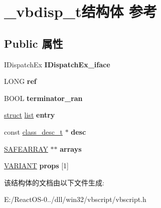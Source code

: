 \hypertarget{struct__vbdisp__t}{}\section{\+\_\+vbdisp\+\_\+t结构体 参考}
\label{struct__vbdisp__t}
\subsection*{Public 属性}
\begin{DoxyCompactItemize}
\item 
\mbox{\label{struct__vbdisp__t_a7200f265b6a5faaa17b4cf261f916a2f}} 
I\+Dispatch\+Ex {\bfseries I\+Dispatch\+Ex\+\_\+iface}
\item 
\mbox{\label{struct__vbdisp__t_ab9bf5b2084776478e15f402dd887f7e0}} 
L\+O\+NG {\bfseries ref}
\item 
\mbox{\label{struct__vbdisp__t_aaa84361d752c387f253e806746d0b2f4}} 
B\+O\+OL {\bfseries terminator\+\_\+ran}
\item 
\mbox{\label{struct__vbdisp__t_a7dc14f10f78931b9272001eb848b7ba3}} 
\hyperlink{interfacestruct}{struct} \hyperlink{classlist}{list} {\bfseries entry}
\item 
\mbox{\label{struct__vbdisp__t_aa933563f5424aa5cb9c4b9abc16ed6d9}} 
const \hyperlink{struct__class__desc__t}{class\+\_\+desc\+\_\+t} $\ast$ {\bfseries desc}
\item 
\mbox{\label{struct__vbdisp__t_a62f198ec264c864902a9b25deac3504d}} 
\hyperlink{structtag_s_a_f_e_a_r_r_a_y}{S\+A\+F\+E\+A\+R\+R\+AY} $\ast$$\ast$ {\bfseries arrays}
\item 
\mbox{\label{struct__vbdisp__t_ae27dd174daec850b74f6e1db6ddce3f0}} 
\hyperlink{structtag_v_a_r_i_a_n_t}{V\+A\+R\+I\+A\+NT} {\bfseries props} \mbox{[}1\mbox{]}
\end{DoxyCompactItemize}


该结构体的文档由以下文件生成\+:\begin{DoxyCompactItemize}
\item 
E\+:/\+React\+O\+S-\/0../dll/win32/vbscript/vbscript.\+h\end{DoxyCompactItemize}
